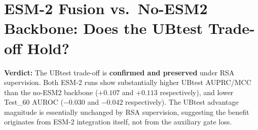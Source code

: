 \documentclass[10pt, a4paper]{article}
\begin{document}
\section{ESM-2 Fusion vs.\ No-ESM2 Backbone: Does the UBtest Trade-off Hold?}

\begin{table}[h]
\centering
\caption{Trade-off check: ESM-2 gated fusion vs.\ no-ESM2 backbone (Run~1).
``UBtest advantage'' = gain of ESM-2 fusion over no-fusion on unbound benchmark.}
\label{tab:tradeoff}
\end{table}

\textbf{Verdict:} The UBtest trade-off is \textbf{confirmed and preserved} under
RSA supervision.  Both ESM-2 runs show substantially higher UBtest AUPRC/MCC
than the no-ESM2 backbone ($+0.107$ and $+0.113$ respectively), and lower
Test\_60 AUROC ($-0.030$ and $-0.042$ respectively).
The UBtest advantage magnitude is essentially unchanged by RSA supervision,
suggesting the benefit originates from ESM-2 integration itself, not
from the auxiliary gate loss.
\end{document}
